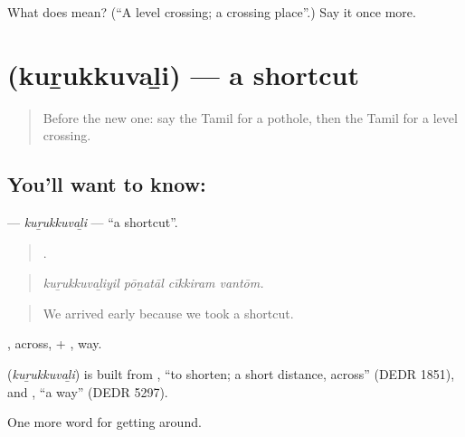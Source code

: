 \begin{tcolorbox}[breakable,colback=teal!4,colframe=teal!35!black,title={Before you move on}]
What does  mean? (\textquotedblleft{}A level crossing; a crossing place\textquotedblright{}.) Say it once more.
\end{tcolorbox}
\section[\texorpdfstring{\ta{குறுக்குவழி} (kuṟukkuvaḻi)}{குறுக்குவழி (kuṟukkuvaḻi)}]{ (kuṟukkuvaḻi) — a shortcut}

\label{lesson:TA-C409-kurukkuvali}



\begin{quote}
Before the new one: say the Tamil for a pothole, then the Tamil for a level crossing.
\end{quote}

\subsection*{You'll want to know: }
\textbf{} — \emph{kuṟukkuvaḻi} — \textquotedblleft{}a shortcut\textquotedblright{}.

\begin{quote}
   .
\end{quote}

\begin{quote}
\emph{kuṟukkuvaḻiyil pōṉatāl cīkkiram vantōm.}
\end{quote}

\begin{quote}
We arrived early because we took a shortcut.
\end{quote}

, across, + , way.

\begin{cousinweb}
\textbf{} (\emph{kuṟukkuvaḻi}) is built from , \textquotedblleft{}to shorten; a short distance, across\textquotedblright{} (DEDR 1851), and , \textquotedblleft{}a way\textquotedblright{} (DEDR 5297).
\end{cousinweb}

\begin{grammarlens}[title={What you've built}]
One more word for getting around.
\end{grammarlens}


